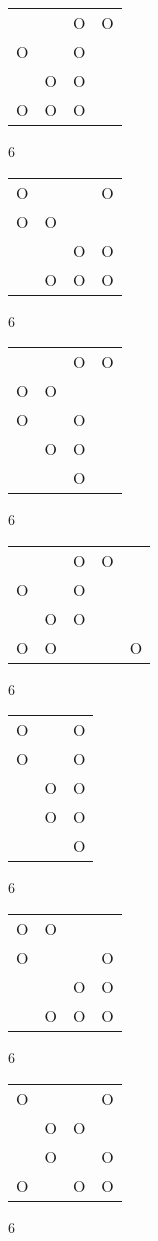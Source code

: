 \begin{tabular}{|m{0.2cm}m{0.2cm}m{0.2cm}m{0.2cm}|}\hline
 & &O&O\\
O& &O& \\
 &O&O& \\
O&O&O& \\
\hline\end{tabular}6
\begin{tabular}{|m{0.2cm}m{0.2cm}m{0.2cm}m{0.2cm}|}\hline
O& & &O\\
O&O& & \\
 & &O&O\\
 &O&O&O\\
\hline\end{tabular}6
\begin{tabular}{|m{0.2cm}m{0.2cm}m{0.2cm}m{0.2cm}|}\hline
 & &O&O\\
O&O& & \\
O& &O& \\
 &O&O& \\
 & &O& \\
\hline\end{tabular}6
\begin{tabular}{|m{0.2cm}m{0.2cm}m{0.2cm}m{0.2cm}m{0.2cm}|}\hline
 & &O&O& \\
O& &O& & \\
 &O&O& & \\
O&O& & &O\\
\hline\end{tabular}6
\begin{tabular}{|m{0.2cm}m{0.2cm}m{0.2cm}|}\hline
O& &O\\
O& &O\\
 &O&O\\
 &O&O\\
 & &O\\
\hline\end{tabular}6
\begin{tabular}{|m{0.2cm}m{0.2cm}m{0.2cm}m{0.2cm}|}\hline
O&O& & \\
O& & &O\\
 & &O&O\\
 &O&O&O\\
\hline\end{tabular}6
\begin{tabular}{|m{0.2cm}m{0.2cm}m{0.2cm}m{0.2cm}|}\hline
O& & &O\\
 &O&O& \\
 &O& &O\\
O& &O&O\\
\hline\end{tabular}6
